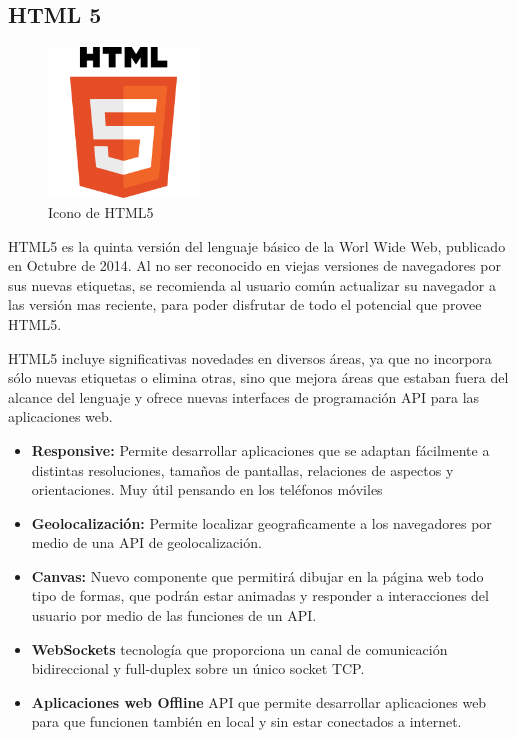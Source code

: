 \subsection{HTML 5}
\begin{figure}[!h]
    \centering
    \includegraphics[width=40mm]{img/introduccion/html5.png}
    \caption{Icono de HTML5}
\end{figure}
HTML5 es la quinta versión del lenguaje básico de la Worl Wide Web, publicado en Octubre de 2014. Al no ser reconocido en viejas versiones de navegadores por sus nuevas etiquetas, se recomienda al usuario común actualizar su navegador a las versión mas reciente, para poder disfrutar de todo el potencial que provee HTML5.

HTML5 incluye significativas novedades en diversos áreas, ya que no incorpora sólo nuevas etiquetas o elimina otras, sino que mejora áreas que estaban fuera del alcance del lenguaje y ofrece nuevas interfaces de programación API para las aplicaciones web.

\begin{itemize}
    \item \textbf{Responsive: } Permite desarrollar aplicaciones que se adaptan fácilmente a distintas resoluciones, tamaños de pantallas, relaciones de aspectos y orientaciones. Muy útil pensando en los teléfonos móviles
    \item \textbf{Geolocalización: }Permite localizar geograficamente a los navegadores por medio de una API de geolocalización.
    \item \textbf{Canvas: } Nuevo componente que permitirá dibujar en la página web todo tipo de formas, que podrán estar animadas y responder a interacciones del usuario por medio de las funciones de un API.
    \item \textbf{WebSockets } tecnología que proporciona un canal de comunicación bidireccional y full-duplex sobre un único socket TCP.
    \item \textbf{Aplicaciones web Offline } API que permite desarrollar aplicaciones web para que funcionen también en local y sin estar conectados a internet.
\end{itemize}
